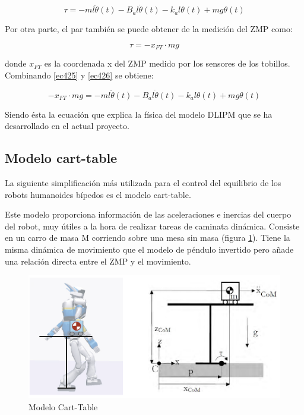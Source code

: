 \begin{equation}
\tau = -ml\ddot{\theta}(t) - B_a l\dot{\theta}(t) - k_a l\theta(t) + mg\theta(t)
\label{ec425}
\end{equation}

Por otra parte, el par también se puede obtener de la medición del ZMP como:

\begin{equation}
\tau = - x_{FT} \cdot mg
\label{ec426}
\end{equation}

donde $x_{FT}$ es la coordenada x del ZMP medido por los sensores de los tobillos. Combinando \ref{ec425} y \ref{ec426} se obtiene:

\begin{equation}
- x_{FT} \cdot mg = -ml\ddot{\theta}(t) - B_a l\dot{\theta}(t) - k_a l\theta(t) + mg\theta(t)
\label{ec427}
\end{equation}

Siendo ésta la ecuación que explica la física del modelo DLIPM que se ha desarrollado en el actual proyecto.

\newpage

\subsection{Modelo cart-table}

La siguiente simplificación más utilizada para el control del equilibrio de los robots humanoides bípedos es el modelo cart-table.

Este modelo proporciona información de las aceleraciones e inercias del cuerpo del robot, muy útiles a la hora de realizar tareas de caminata dinámica. Consiste en un carro de masa M corriendo sobre una mesa sin masa (figura \ref{figura46}). Tiene la misma dinámica de movimiento que el modelo de péndulo invertido pero añade una relación directa entre el ZMP y el movimiento.

\begin{figure}[H]
\centering
\includegraphics[scale=0.5]{imagenes/apartado_4/46_cart_table_model_2}
\caption{Modelo Cart-Table}
\label{figura46}
\end{figure}

